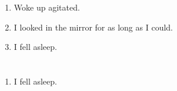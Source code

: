 \documentclass{article}
\begin{document}
    \begin{enumerate}
    
    \item Woke up agitated.\\
    
    \item I looked in the mirror for as long as I could.\\
    
    \item I fell asleep.\\
    
    \end{enumerate}
     
    \newpage
    
    \section{}
    
    \begin{enumerate}
    
    \item I fell asleep.\\
    
    \end{enumerate}
     
    \newpage
    
    \section{}
    
\end{document}
